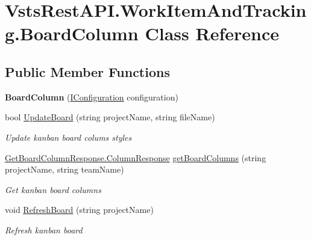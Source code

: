 \hypertarget{class_vsts_rest_a_p_i_1_1_work_item_and_tracking_1_1_board_column}{}\section{Vsts\+Rest\+A\+P\+I.\+Work\+Item\+And\+Tracking.\+Board\+Column Class Reference}
\label{class_vsts_rest_a_p_i_1_1_work_item_and_tracking_1_1_board_column}
\subsection*{Public Member Functions}
\begin{DoxyCompactItemize}
\item 
\mbox{\label{class_vsts_rest_a_p_i_1_1_work_item_and_tracking_1_1_board_column_af8a3fb2feb827f05262695f8bced2cc1}} 
{\bfseries Board\+Column} (\mbox{\hyperlink{interface_vsts_rest_a_p_i_1_1_i_configuration}{I\+Configuration}} configuration)
\item 
bool \mbox{\hyperlink{class_vsts_rest_a_p_i_1_1_work_item_and_tracking_1_1_board_column_a5e492fd7d8cc70eae58565322bd7fcda}{Update\+Board}} (string project\+Name, string file\+Name)
\begin{DoxyCompactList}\small\item\em Update kanban board colums styles \end{DoxyCompactList}\item 
\mbox{\hyperlink{class_vsts_rest_a_p_i_1_1_viewmodel_1_1_work_item_1_1_get_board_column_response_1_1_column_response}{Get\+Board\+Column\+Response.\+Column\+Response}} \mbox{\hyperlink{class_vsts_rest_a_p_i_1_1_work_item_and_tracking_1_1_board_column_ab37fe206629cd139eeb2e6c634e56859}{get\+Board\+Columns}} (string project\+Name, string team\+Name)
\begin{DoxyCompactList}\small\item\em Get kanban board columns \end{DoxyCompactList}\item 
void \mbox{\hyperlink{class_vsts_rest_a_p_i_1_1_work_item_and_tracking_1_1_board_column_a6ad605cdf943060efe528fa34b38b225}{Refresh\+Board}} (string project\+Name)
\begin{DoxyCompactList}\small\item\em Refresh kanban board \end{DoxyCompactList}\end{DoxyCompactItemize}
